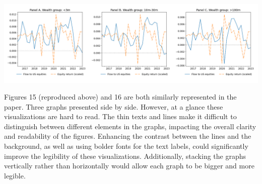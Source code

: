 \documentclass[]{article}
\begin{document}
\begin{spacing}{1.25}
	
		\begin{center}
			\includegraphics[width=\linewidth]{screenshot002}
		\end{center}
		Figures 15 (reproduced above) and 16 are both similarly represented in the paper. Three graphs presented side by side. However, at a glance these visualizations are hard to read. The thin texts and lines make it difficult to distinguish between different elements in the graphs, impacting the overall clarity and readability of the figures. Enhancing the contrast between the lines and the background, as well as using bolder fonts for the text labels, could significantly improve the legibility of these visualizations. Additionally, stacking the graphs vertically rather than horizontally would allow each graph to be bigger and more legible.
	
		


\pagebreak
\printbibliography

\end{spacing}
\end{document}
